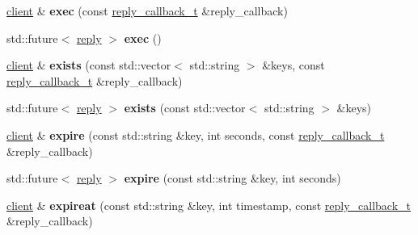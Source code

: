 \begin{DoxyCompactItemize}
\item 
\mbox{\label{classcpp__redis_1_1client_a76e78829c4ee2e1484268e465fab8997}} 
\hyperlink{classcpp__redis_1_1client}{client} \& {\bfseries exec} (const \hyperlink{classcpp__redis_1_1client_a061a1140d36d2eaeda82b09a0bb3f9f2}{reply\+\_\+callback\+\_\+t} \&reply\+\_\+callback)
\item 
\mbox{\label{classcpp__redis_1_1client_a93c5b232ae13b5107b6aa1ea5f70b70d}} 
std\+::future$<$ \hyperlink{classcpp__redis_1_1reply}{reply} $>$ {\bfseries exec} ()
\item 
\mbox{\label{classcpp__redis_1_1client_a11836c341d54a9d767cd37508bf87d73}} 
\hyperlink{classcpp__redis_1_1client}{client} \& {\bfseries exists} (const std\+::vector$<$ std\+::string $>$ \&keys, const \hyperlink{classcpp__redis_1_1client_a061a1140d36d2eaeda82b09a0bb3f9f2}{reply\+\_\+callback\+\_\+t} \&reply\+\_\+callback)
\item 
\mbox{\label{classcpp__redis_1_1client_a16ab72e15bd14a3fd2eb97194cea3d2d}} 
std\+::future$<$ \hyperlink{classcpp__redis_1_1reply}{reply} $>$ {\bfseries exists} (const std\+::vector$<$ std\+::string $>$ \&keys)
\item 
\mbox{\label{classcpp__redis_1_1client_ab2c50e9f37a4e6a5dff059c991dbd15e}} 
\hyperlink{classcpp__redis_1_1client}{client} \& {\bfseries expire} (const std\+::string \&key, int seconds, const \hyperlink{classcpp__redis_1_1client_a061a1140d36d2eaeda82b09a0bb3f9f2}{reply\+\_\+callback\+\_\+t} \&reply\+\_\+callback)
\item 
\mbox{\label{classcpp__redis_1_1client_aeb2f8b475d5adf23a25ae066e1ff45f4}} 
std\+::future$<$ \hyperlink{classcpp__redis_1_1reply}{reply} $>$ {\bfseries expire} (const std\+::string \&key, int seconds)
\item 
\mbox{\label{classcpp__redis_1_1client_a7b5e1b089d68a0cb71f72fb6aecb0a63}} 
\hyperlink{classcpp__redis_1_1client}{client} \& {\bfseries expireat} (const std\+::string \&key, int timestamp, const \hyperlink{classcpp__redis_1_1client_a061a1140d36d2eaeda82b09a0bb3f9f2}{reply\+\_\+callback\+\_\+t} \&reply\+\_\+callback)

\end{DoxyCompactItemize}

